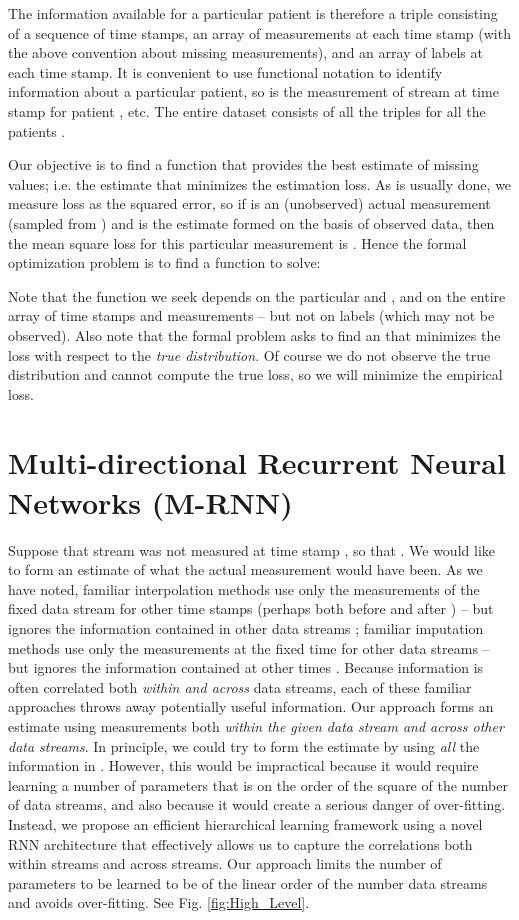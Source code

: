 \documentclass{article}
\begin{document}
	The information available for  a particular patient  is therefore a triple consisting of a sequence of time stamps, an array of measurements at each time stamp (with the above convention about missing measurements), and an array of labels at each time stamp. It is convenient to use functional notation to identify information about a particular patient, so  is the measurement of stream  at time stamp  for patient , etc. The entire dataset consists of all the triples for all the patients 
	.
	
	Our   objective is to find a function  that provides the best estimate of missing values; i.e. the estimate that minimizes the estimation loss.  As is usually done, we measure loss as the squared error, so if  is an (unobserved) actual measurement (sampled from 	) and  is the estimate formed on the basis of observed data, then the mean square loss for this particular measurement is .  Hence the formal optimization problem is  to find a function  to solve:
	
    Note that the function  we seek depends on the particular   and , and on the entire array of time stamps and measurements -- but not on labels (which may not be observed). Also note that the formal  problem asks to find an  that minimizes the loss with respect to the {\em true distribution}.  Of course we do not observe the true distribution and cannot compute the true loss, so we will minimize the empirical loss.

	\section{Multi-directional Recurrent Neural Networks (M-RNN)}
	Suppose that stream  was not measured at time stamp , so that .  We would like to form an estimate 
	 of what the actual measurement would have been. As we have noted, familiar interpolation methods use only the measurements  of the fixed data stream  for other time stamps  (perhaps both before and after ) -- but ignores the information contained in other data streams ;  familiar imputation methods use only the measurements  at the fixed time  for other data streams  -- but ignores the information contained at other times .  Because information is often correlated both {\em within and across} data streams, each of these familiar approaches throws away potentially useful information. Our approach forms an estimate 
	  using  measurements both {\em within the given data stream and  across other data streams}. In principle, we could try to form the estimate  by using {\em all} the information in . However, this would be impractical because it would require learning a  number of parameters that is on the order of the square of the number of data streams, and also because it would create a serious danger of over-fitting. Instead, we propose an efficient hierarchical learning framework using a novel RNN architecture that effectively allows us to capture the correlations both within streams and across streams.  Our approach limits the number of parameters to be learned to be of the linear order of the number data streams and avoids over-fitting. See Fig. \ref{fig:High_Level}.
	
\end{document}
